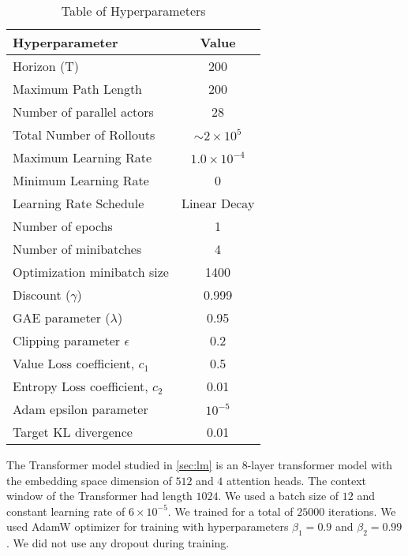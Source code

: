 \begin{table}[ht]
    \centering
    \begin{tabular}{lc}
        \hline
        Hyperparameter & Value \\
        \hline
        Horizon (T) & 200 \\
        Maximum Path Length & 200 \\
        Number of parallel actors & 28 \\
        Total Number of Rollouts & $\sim 2 \times 10^5$ \\
        Maximum Learning Rate & $1.0 \times 10^{-4}$ \\
        Minimum Learning Rate & 0 \\
        Learning Rate Schedule & Linear Decay \\
        Number of epochs & 1 \\
        Number of minibatches & 4 \\
        Optimization minibatch size & 1400 \\
        Discount ($\gamma$) & 0.999 \\
        GAE parameter ($\lambda$) & 0.95 \\
        Clipping parameter $\epsilon$ & 0.2 \\
        Value Loss coefficient, $c_1$ & 0.5 \\
        Entropy Loss coefficient, $c_2$ & 0.01 \\
        Adam epsilon parameter & $10^{-5}$ \\
        Target KL divergence & 0.01 \\
        \hline
    \end{tabular}
    \caption{Table of Hyperparameters}
    \label{tab:ppo_hyperparameters}
\end{table}

The Transformer model studied in \autoref{sec:lm} is an 8-layer transformer model with the embedding space dimension of $512$ and $4$ attention heads. The context window of the Transformer had length $1024$. We used a batch size of $12$ and constant learning rate of $6 \times 10^{-5}$. We trained for a total of $25000$ iterations. We used AdamW optimizer for training with hyperparameters $\beta_1 = 0.9$ and $\beta_2 = 0.99$. We did not use any dropout during training. 